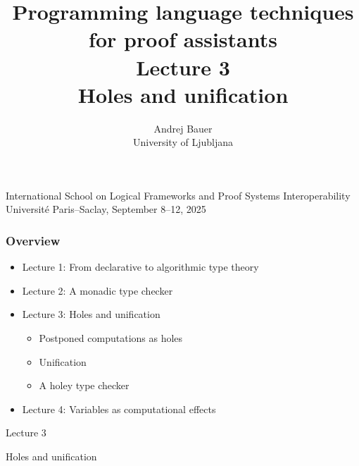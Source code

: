 \documentclass[handout,10pt,aspectratio=169]{beamer}
\title{Programming language techniques \\for proof assistants\\[2ex]Lecture 3\\Holes and unification}
\author{Andrej Bauer\\University of Ljubljana}
\date{}
\begin{document}
\begin{frame}
\hbox{}\vfil

\titlepage

\vfil

\begin{center}
\footnotesize
International School on Logical Frameworks and Proof Systems Interoperability \\
Université Paris--Saclay, September 8--12, 2025
\end{center}

\end{frame}

\begin{frame}
  \frametitle{Overview}

  \begin{itemize}
  \item \textcolor{grayoutColor}{Lecture 1: From declarative to algorithmic type theory}
  \item \textcolor{grayoutColor}{Lecture 2: A monadic type checker}
  \item
    Lecture 3: Holes and unification
    \begin{itemize}
    \item Postponed computations as holes
    \item Unification
    \item A holey type checker
    \end{itemize}
  \item
    \textcolor{grayoutColor}{Lecture 4: Variables as computational effects}
  \end{itemize}


\end{frame}

\begin{frame}
  \begin{center}
    \Huge Lecture 3

    \bigskip

    \Large
    Holes and unification
  \end{center}
\end{frame}
\end{document}
